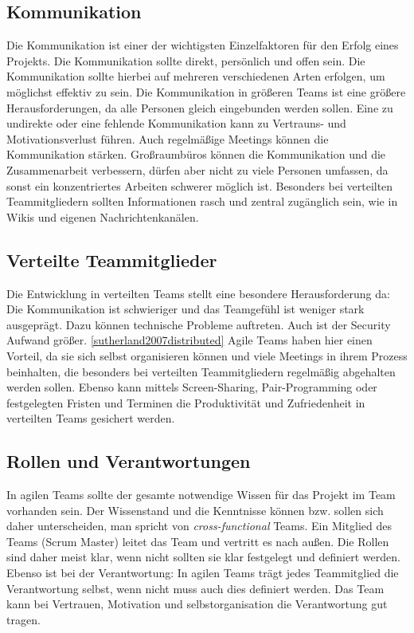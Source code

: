 \subsection{Kommunikation}
Die Kommunikation ist einer der wichtigsten Einzelfaktoren für den Erfolg eines Projekts. Die Kommunikation sollte direkt, persönlich und offen sein. Die Kommunikation sollte hierbei auf mehreren verschiedenen Arten erfolgen, um möglichst effektiv zu sein. Die Kommunikation in größeren Teams ist eine größere Herausforderungen, da alle Personen gleich eingebunden werden sollen. Eine zu undirekte oder eine fehlende Kommunikation kann zu Vertrauns- und Motivationsverlust führen. Auch regelmäßige Meetings können die Kommunikation stärken. Großraumbüros können die Kommunikation und die Zusammenarbeit verbessern, dürfen aber nicht zu viele Personen umfassen, da sonst ein konzentriertes Arbeiten schwerer möglich ist. Besonders bei verteilten Teammitgliedern sollten Informationen rasch und zentral zugänglich sein, wie in Wikis und eigenen Nachrichtenkanälen. 
\subsection{Verteilte Teammitglieder}
Die Entwicklung in verteilten Teams stellt eine besondere Herausforderung da: Die Kommunikation ist schwieriger und das Teamgefühl ist weniger stark ausgeprägt. Dazu können technische Probleme auftreten. Auch ist der Security Aufwand größer. \ref{sutherland2007distributed} Agile Teams haben hier einen Vorteil, da sie sich selbst organisieren können und viele Meetings in ihrem Prozess beinhalten, die besonders bei verteilten Teammitgliedern regelmäßig abgehalten werden sollen. Ebenso kann mittels Screen-Sharing, Pair-Programming oder festgelegten Fristen und Terminen die Produktivität und Zufriedenheit in verteilten Teams gesichert werden. 
\subsection{Rollen und Verantwortungen}
In agilen Teams sollte der gesamte notwendige Wissen für das Projekt im Team vorhanden sein. Der Wissenstand und die Kenntnisse können bzw. sollen sich daher unterscheiden, man spricht von \textit{cross-functional} Teams.  Ein Mitglied des Teams (Scrum Master) leitet das Team und vertritt es nach außen. Die Rollen sind daher meist klar, wenn nicht sollten sie klar festgelegt und definiert werden. Ebenso ist bei der Verantwortung: In agilen Teams trägt jedes Teammitglied die Verantwortung selbst, wenn nicht muss auch dies definiert werden. Das Team kann bei Vertrauen, Motivation und selbstorganisation die Verantwortung gut tragen.
